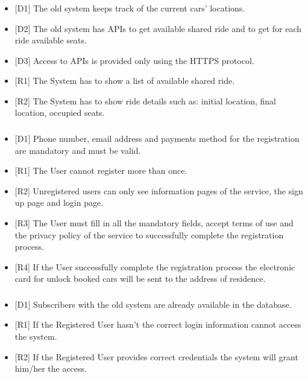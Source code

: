 \subsubsection{\gSystemShare}
\begin{itemize}
	\item {[}D1{]} The old system keeps track of the current cars' locations.
	\item {[}D2{]} The old system has APIs to get available shared ride and to get for each ride available seats.
	\item {[}D3{]} Access to APIs is provided only using the HTTPS protocol.
	\item {[}R1{]} The System has to show a list of available shared ride.
	\item {[}R2{]} The System has to show ride details such as: initial location, final location, occupied seats.
\end{itemize}
\subsubsection{\gVisitorSignUp}
\begin{itemize}
	\item {[}D1{]} Phone number, email address and payments method for the registration are mandatory and must be valid.
	\item {[}R1{]} The User cannot register more than once.
	\item {[}R2{]} Unregistered users can only see information pages of the service, the sign up page and login page.
	\item {[}R3{]} The User must fill in all the mandatory fields, accept terms of use and the privacy policy of the service to successfully complete the registration process.
	\item {[}R4{]} If the User successfully complete the registration process the electronic card for unlock booked cars will be sent to the address of residence.
\end{itemize}
\subsubsection{\gRegisteredLogin}
\begin{itemize}
	\item {[}D1{]} Subscribers with the old system are already available in the database.
	\item {[}R1{]} If the Registered User hasn’t the correct login information cannot access the system.
	\item {[}R2{]} If the Registered User provides correct credentials the system will grant him/her the access.
\end{itemize}
